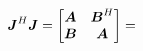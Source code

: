 \documentclass[useAMS,usenatbib]{mn2e}
\makeatletter
\newcommand{\mat}[1]{{\bmath{#1}}}
\newcommand{\JJ}{\mat{J}} %
\newcommand{\JHJ}{\JJ^H\JJ} %
\newcommand{\Matrix}[2]{\left [ \begin{array}{@{}#1@{}}#2\end{array} \right ]}
\newcommand{\AUG}[1]{\bmath{\breve{#1}}}
\newcommand{\Gg}{\AUG{g}}
\newcommand{\Rr}{\AUG{r}}
\newcommand{\Vv}{\AUG{v}}
\newcommand{\LEFT}{\mathrm{L}}
\numberwithin{equation}{section} %
\providecommand{\DIFdelbegin}{} %
\providecommand{\DIFdelend}{} %
\makeatother
\begin{document}
\DIFdelend \begin{equation}
\JHJ = \Matrix{cc}{\bmath{A}&\bmath{B}^H\\\bmath{B}&\bmath{A}}
= \DIFdelbegin %
\end{equation}%




\end{document}
